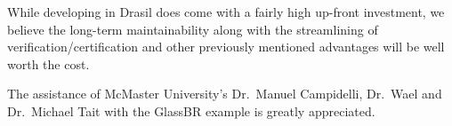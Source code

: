 \documentclass[sigconf]{acmart}
\begin{document}
While developing in Drasil does come with a fairly high up-front investment, we 
believe the long-term maintainability along with the streamlining of 
verification/certification and other previously mentioned advantages 
will be well worth the cost.

\begin{acks}
The assistance of McMaster University's Dr.\ Manuel Campidelli, Dr.\ Wael and
Dr.\ Michael Tait with the GlassBR example is greatly appreciated.
\end{acks}


 
\end{document}
